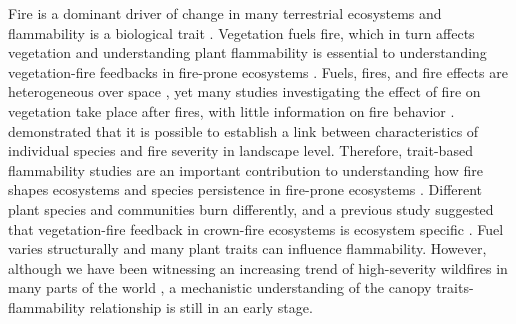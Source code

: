 \documentclass{ttuthes2007}
\begin{document}
\noindent Fire is a dominant driver of change in many terrestrial ecosystems and flammability is a biological trait \citep{pausasandmoi2012flammability}. Vegetation fuels fire, which in turn affects vegetation \citep{bova2005linking, jones2006prediction, kavanagh2010way,o2010acute, michaletz2012moving, west2016experimental, lodge2018xylem, bar2019fire}
and understanding plant flammability is essential to understanding vegetation-fire feedbacks in fire-prone ecosystems \citep{pausas2012fire, pausas2017flammability}. Fuels, fires, and fire effects are heterogeneous over space \citep{gagnon2010does}, yet many studies investigating the effect of fire on vegetation take place after fires, with little information on fire behavior \citep{o2018advances}. \citet{schwilk2011scaling} demonstrated that it is possible to establish a link between characteristics of individual species  and fire severity in landscape level. Therefore, trait-based flammability studies are an important contribution to understanding how fire shapes ecosystems and species persistence in fire-prone ecosystems \citep{pausas2012fire, pausas2017flammability}. Different plant species and communities burn differently, and a previous study suggested that vegetation-fire feedback in crown-fire ecosystems is ecosystem specific \citep{pausas2004plant}. Fuel varies structurally and many plant traits can influence flammability. %
However, although we have been witnessing an increasing trend of high-severity wildfires in many parts of the world \citep{miller2012trends, dennison2014large, weber2020spatiotemporal, salguero2020wildfire}, a mechanistic understanding of the canopy traits-flammability relationship is still in an early stage.
\end{document}
